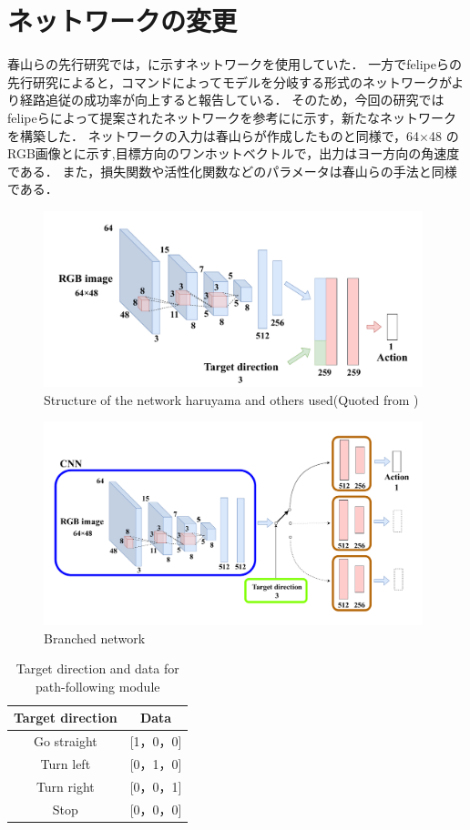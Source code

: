 \section{ネットワークの変更}
春山らの先行研究では，に示すネットワークを使用していた．
一方でfelipeらの先行研究によると，コマンドによってモデルを分岐する形式のネットワークがより経路追従の成功率が向上すると報告している．
そのため，今回の研究ではfelipeらによって提案されたネットワークを参考にに示す，新たなネットワークを構築した．
ネットワークの入力は春山らが作成したものと同様で，64×48 の RGB画像とに示す,目標方向のワンホットベクトルで，出力はヨー方向の角速度である．
また，損失関数や活性化関数などのパラメータは春山らの手法と同様である．

\begin{figure}[htbp]
  \centering
  \includegraphics[width=110mm]{images/pdf/haruyama/net.pdf}
  \caption[Structure of the network haruyama and others used]{Structure of the network haruyama and others used(Quoted from \cite{fujiwara2023})}
  \label{fig:haruyama_net}
\end{figure}

\begin{figure}[htbp]
  \centering
   \includegraphics[width=110mm]{images/pdf/ishiguro/branched.pdf}
   \caption{Branched network}
   \label{fig:branched}
\end{figure}

\begin{table}[htbp]
  \centering
  \caption{Target direction and data for path-following module}\label{tab:cmd_dir}
  \begin{tabular}{|c|c|}
  \hline
  Target direction & Data        \\
  \hline
  Go straight   & {[}1，0，0{]} \\
  Turn left   & {[}0，1，0{]} \\
  Turn right   & {[}0，0，1{]} \\
  Stop   & {[}0，0，0{]}\\
  \hline
  \end{tabular}
\end{table}

\clearpage